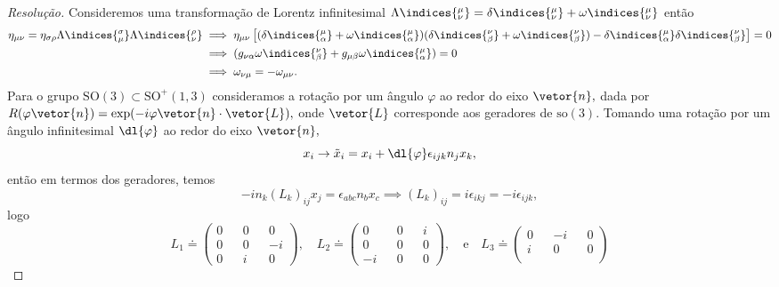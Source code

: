 \begin{proof}[Resolução]
    Consideremos uma transformação de Lorentz infinitesimal \(\Lambda\indices{^\mu_\nu} = \delta\indices{^\mu_\nu} + \omega\indices{^\mu_\nu}\) então
    \begin{align*}
        \eta_{\mu\nu} = \eta_{\sigma \rho} \Lambda\indices{^\sigma_\mu} \Lambda\indices{^\rho_\nu}
        &\implies \eta_{\mu\nu} \left[(\delta\indices{^\mu_\alpha} + \omega\indices{^\mu_\alpha}) (\delta\indices{^\nu_\beta} + \omega\indices{^\nu_\beta}) - \delta\indices{^\mu_\alpha} \delta\indices{^\nu_\beta}\right] = 0\\
        &\implies (g_{\nu\alpha} \omega\indices{^\nu_\beta} + g_{\mu \beta}\omega\indices{^\mu_\alpha}) = 0\\
        &\implies \omega_{\nu\mu} = -\omega_{\mu\nu}.
    \end{align*}
    Para o grupo \(\mathrm{SO}(3)\subset \mathrm{SO}^+(1,3)\) consideramos a rotação por um ângulo \(\varphi\) ao redor do eixo \(\vetor{n},\) dada por \(R(\varphi\vetor{n}) = \exp(-i \varphi \vetor{n}\cdot \vetor{L}),\) onde \(\vetor{L}\) corresponde aos geradores de \(\mathrm{so}(3).\) Tomando uma rotação por um ângulo infinitesimal \(\dl{\varphi}\) ao redor do eixo \(\vetor{n},\)
    \begin{equation*}
        x_i \to \tilde{x}_i = x_i + \dl{\varphi} \epsilon_{ijk} n_j x_k,
    \end{equation*}
    então em termos dos geradores, temos
    \begin{equation*}
        -i  n_k (L_k)_{ij} x_j = \epsilon_{abc} n_b x_c \implies (L_k)_{ij} = i \epsilon_{ikj} = -i \epsilon_{ijk},
    \end{equation*}
    logo
    \begin{equation*}
        L_1 \doteq \begin{pmatrix}
            0 && 0 && 0\\
            0 && 0 && -i\\
            0 && i && 0
        \end{pmatrix},
        \quad
        L_2 \doteq \begin{pmatrix}
            0 && 0 && i\\
            0 && 0 && 0\\
            -i && 0 && 0
        \end{pmatrix},
        \quad\text{e}\quad
        L_3 \doteq \begin{pmatrix}
            0 && -i && 0\\
            i && 0 && 0\\

\end{pmatrix}
\end{equation*}
\end{proof}
